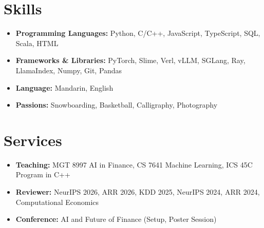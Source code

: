 \documentclass[a4paper,11pt]{article}
\newcommand{\resumeItem}[2]{
  \item{
    \textbf{#1}{\hspace{0.5mm}#2 \vspace{-0.5mm}}
  }
}
\newcommand{\resumeSubItem}[2]{\resumeItem{#1}{#2}\vspace{-4pt}}
\newcommand{\resumeHeadingSkillStart}{\begin{itemize}[leftmargin=*,itemsep=1.7mm, rightmargin=2ex]}
\newcommand{\resumeHeadingSkillEnd}{\end{itemize}\vspace{-2mm}}
\begin{document}
\section{\textbf{Skills}}
\vspace{-0.4mm}
 \resumeHeadingSkillStart
  \resumeSubItem{Programming Languages:}
    { Python, C/C++, JavaScript, TypeScript, SQL, Scala, HTML}
  \resumeSubItem{Frameworks \& Libraries:}
    { PyTorch, Slime, Verl, vLLM, SGLang, Ray, LlamaIndex, Numpy, Git, Pandas}
  \resumeSubItem{Language:}
    { Mandarin, English}
  \resumeSubItem{Passions:}
    { Snowboarding, Basketball, Calligraphy, Photography}
 \resumeHeadingSkillEnd

\section{\textbf{Services}}
\vspace{-0.4mm}
 \resumeHeadingSkillStart
 \resumeSubItem{Teaching:}
    { MGT 8997 AI in Finance, CS 7641 Machine Learning, ICS 45C Program in C++}
  \resumeSubItem{Reviewer:}
    { NeurIPS 2026, ARR 2026, KDD 2025, NeurIPS 2024, ARR 2024, Computational Economics}
  \resumeSubItem{Conference:}
    { AI and Future of Finance (Setup, Poster Session)}
 \resumeHeadingSkillEnd
\end{document}

